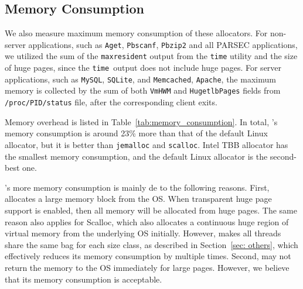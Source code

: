 \subsection{Memory Consumption}
\label{sec:memory}

We also measure maximum memory consumption of these allocators. For non-server applications, such as \texttt{Aget}, \texttt{Pbscanf}, \texttt{Pbzip2} and all PARSEC applications, we utilized the sum of the \texttt{maxresident} output from the \texttt{time} utility and the size of huge pages, since the \texttt{time }output does not include huge pages. 
For server applications, such as \texttt{MySQL}, \texttt{SQLite}, and \texttt{Memcached}, \texttt{Apache}, the maximum memory is collected by the sum of both \texttt{VmHWM} and \texttt{HugetlbPages} fields from \texttt{/proc/PID/status} file, after the corresponding client exits. 




Memory overhead is listed in Table~\ref{tab:memory_consumption}. In total, \NM{}'s memory consumption is around 23\% more than that of the default Linux allocator, but it is better than \texttt{jemalloc} and \texttt{scalloc}.  Intel TBB allocator has the smallest memory consumption, and the default Linux allocator is the second-best one. 
 
  \NM{}'s more memory consumption is mainly de to the following reasons. First, \NM{} allocates a large memory block from the OS. When transparent huge page support is enabled, then all memory will be allocated from huge pages. The same reason also applies for Scalloc, which also allocates a continuous huge region of virtual memory from the underlying OS initially. However, \NM{} makes all threads share the same bag for each size class, as described in Section~\ref{sec: others}, which effectively reduces its memory consumption by multiple times. Second, \NM{} may not return the memory to the OS immediately for large pages. However, we believe that its memory consumption is acceptable. 
 
